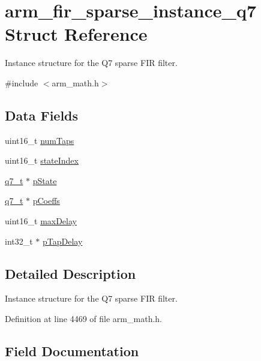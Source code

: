 \hypertarget{structarm__fir__sparse__instance__q7}{}\section{arm\+\_\+fir\+\_\+sparse\+\_\+instance\+\_\+q7 Struct Reference}
\label{structarm__fir__sparse__instance__q7}


Instance structure for the Q7 sparse F\+IR filter.  




{\ttfamily \#include $<$arm\+\_\+math.\+h$>$}

\subsection*{Data Fields}
\begin{DoxyCompactItemize}
\item 
uint16\+\_\+t \hyperlink{structarm__fir__sparse__instance__q7_a751941891e47f522a7f5375fe8990aac}{num\+Taps}
\item 
uint16\+\_\+t \hyperlink{structarm__fir__sparse__instance__q7_a566a0cb53437e48b9a3bf18e5b03d8aa}{state\+Index}
\item 
\hyperlink{arm__math_8h_ae541b6f232c305361e9b416fc9eed263}{q7\+\_\+t} $\ast$ \hyperlink{structarm__fir__sparse__instance__q7_aa8f67102521b620af6f259afdcf29785}{p\+State}
\item 
\hyperlink{arm__math_8h_ae541b6f232c305361e9b416fc9eed263}{q7\+\_\+t} $\ast$ \hyperlink{structarm__fir__sparse__instance__q7_a54407554b4fe7bbbb43924e4eea45e7f}{p\+Coeffs}
\item 
uint16\+\_\+t \hyperlink{structarm__fir__sparse__instance__q7_ab25f4ee7550e6d92acff77ada283733f}{max\+Delay}
\item 
int32\+\_\+t $\ast$ \hyperlink{structarm__fir__sparse__instance__q7_adec00b3793ab4f08edfeb4ea6a9eb6e6}{p\+Tap\+Delay}
\end{DoxyCompactItemize}


\subsection{Detailed Description}
Instance structure for the Q7 sparse F\+IR filter. 

Definition at line 4469 of file arm\+\_\+math.\+h.



\subsection{Field Documentation}
